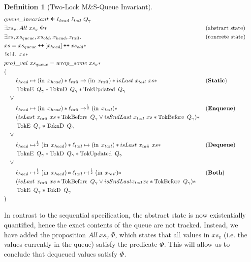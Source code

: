 \documentclass[twoside,11pt,openright]{report}
\newtheorem{definition}{Definition}[section]
\newcommand{\isLL}{\operatorname{isLL}}
\newcommand{\nIn}[1]{\operatorname{in} \; #1}
\newcommand{\StaticState}{\textbf{Static}}
\newcommand{\EnqueueState}{\textbf{Enqueue}}
\newcommand{\DequeueState}{\textbf{Dequeue}}
\newcommand{\BothState}{\textbf{Both}}
\newcommand{\Qg}{Q_\gname}
\newcommand{\TokE}[1]{\operatorname{TokE}\ #1}
\newcommand{\TokEQg}{\TokE{\Qg}}
\newcommand{\ToknE}[1]{\operatorname{ToknE}\ #1}
\newcommand{\ToknEQg}{\ToknE{\Qg}}
\newcommand{\TokD}[1]{\operatorname{TokD}\ #1}
\newcommand{\TokDQg}{\TokD{\Qg}}
\newcommand{\ToknD}[1]{\operatorname{ToknD}\ #1}
\newcommand{\ToknDQg}{\ToknD{\Qg}}
\newcommand{\TokBefore}[1]{\operatorname{TokBefore}\ #1}
\newcommand{\TokBeforeQg}{\TokBefore{\Qg}}
\newcommand{\TokAfterQg}{\TokBefore{\Qg}}
\newcommand{\TokUpdated}[1]{\operatorname{TokUpdated}\ #1}
\newcommand{\TokUpdatedQg}{\TokUpdated{\Qg}}
\newcommand\catenate{\mathbin{\text{\ttfamily\upshape ++}}}
\begin{document}
\begin{definition}[Two-Lock M\&S-Queue Invariant]\label{MSQTL:spec:invariant}
  \begin{align*}
    &queue\_invariant \ \Phi \ \loc_{head} \ \loc_{tail} \ Q_\gname =\\
    &\Exists xs_v. All \ xs_v \ \Phi \ast &&\text{(abstract state)}\\
    &\Exists xs, xs_{queue}, xs_{old}, x_{head}, x_{tail} . &&\text{(concrete state)}\\
    &xs = xs_{queue} \catenate [x_{head}] \catenate xs_{old} \ast\\
    &\isLL \ xs \ast\\
    &proj\_val \ xs_{queue} = wrap\_some \ xs_v \ast\\
    &(\\
    &\quad\quad\loc_{head} \mapsto (\nIn{x_{head}}) \ast \loc_{tail} \mapsto (\nIn{x_{tail}}) \ast isLast \ x_{tail} \ xs \ast &&\text{(\StaticState)}\\
    &\quad\quad \ToknEQg \ast \ToknDQg \ast \TokUpdatedQg\\
    &\quad\lor\\
    &\quad\quad\loc_{head} \mapsto (\nIn{x_{head}}) \ast \loc_{tail} \mapsto^{\frac{1}{2}} (\nIn{x_{tail}}) \ast &&\text{(\EnqueueState)}\\
    &\quad\quad (isLast \ x_{tail} \ xs \ast \TokBeforeQg \lor isSndLast \ x_{tail} \ xs \ast \TokAfterQg) \ast\\
    &\quad\quad \TokEQg \ast \ToknDQg\\
    &\quad\lor\\
    &\quad\quad\loc_{head} \mapsto^{\frac{1}{2}} (\nIn{x_{head}}) \ast \loc_{tail} \mapsto (\nIn{x_{tail}}) \ast isLast \ x_{tail} \ xs \ast &&\text{(\DequeueState)}\\
    &\quad\quad \ToknEQg \ast \TokDQg \ast \TokUpdatedQg\\
    &\quad\lor\\
    &\quad\quad\loc_{head} \mapsto^{\frac{1}{2}} (\nIn{x_{head}}) \ast \loc_{tail} \mapsto^{\frac{1}{2}} (\nIn{x_{tail}}) \ast &&\text{(\BothState)}\\
    &\quad\quad (isLast \ x_{tail} \ xs \ast \TokBeforeQg \lor isSndLast x_{tail} xs \ast \TokAfterQg) \ast\\
    &\quad\quad \TokEQg \ast \TokDQg\\
    &)
  \end{align*}
\end{definition}
In contrast to the sequential specification, the abstract state is now existentially quantified, hence the exact contents of the queue are not tracked. Instead, we have added the proposition $All \ xs_v \ \Phi$, which states that all values in $xs_v$ (i.e. the values currently in the queue) satisfy the predicate $\Phi$. This will allow us to conclude that dequeued values satisfy $\Phi$.\\
\end{document}
